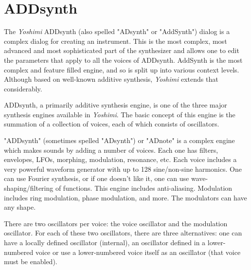 %
%
%

\section{ADDsynth}
\label{sec:addsynth}

   The \textsl{Yoshimi} ADDsynth (also spelled "ADsynth" or "AddSynth")
   dialog is a complex dialog for creating an
   instrument.  This is the most complex, most advanced and most
   sophisticated part of the synthesizer and allows one to edit the
   parameters that apply to all the voices of ADDsynth.
   AddSynth is the most complex and feature filled engine,
   and so is split up into various context levels.
   Although based on well-known additive synthesis,
   \textsl{Yoshimi} extends that considerably.

   ADDsynth, a primarily additive synthesis engine, is one of the three major
   synthesis engines available in \textsl{Yoshimi}.
   The basic concept of this engine is the summation of a collection of voices,
   each of which consists of oscillators.

   "ADDsynth" (sometimes spelled "ADsynth") or "ADnote" is a complex engine
   which makes sounds by adding a number of voices. Each one has filters,
   envelopes, LFOs, morphing, modulation, resonance, etc.
   Each voice includes a very powerful
   waveform generator with up to 128 sine/non-sine harmonics. One can use
   Fourier synthesis, or if one doesn't like it, one can use
   wave-shaping/filtering of functions. This engine includes anti-aliasing.
   Modulation includes ring modulation, phase modulation, and more.
   The modulators can have any shape.
   \cite{zyndoc}

   There are two oscillators per voice: the  voice
   oscillator and the  modulation oscillator. For
   each of these two oscillators, there are three alternatives: one can have a
   locally defined oscillator (internal), an oscillator defined in a
   lower-numbered voice or use a lower-numbered voice itself as an oscillator
   (that voice must be enabled).

